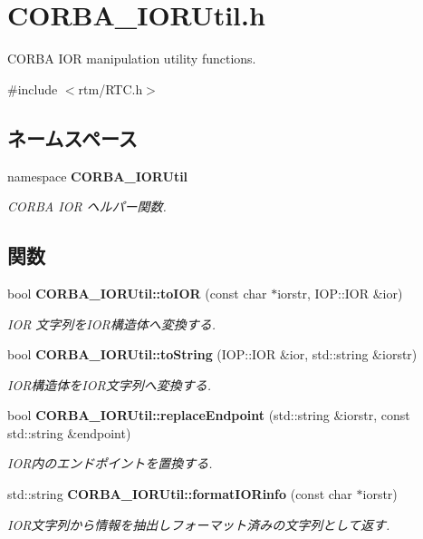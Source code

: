 \section{CORBA\_\-IORUtil.h}
\label{CORBA__IORUtil_8h}


CORBA IOR manipulation utility functions.  


{\ttfamily \#include $<$rtm/RTC.h$>$}\par
\subsection*{ネームスペース}
\begin{DoxyCompactItemize}
\item 
namespace {\bf CORBA\_\-IORUtil}


\begin{DoxyCompactList}\small\item\em CORBA IOR ヘルパー関数. \item\end{DoxyCompactList}

\end{DoxyCompactItemize}
\subsection*{関数}
\begin{DoxyCompactItemize}
\item 
bool {\bf CORBA\_\-IORUtil::toIOR} (const char $\ast$iorstr, IOP::IOR \&ior)
\begin{DoxyCompactList}\small\item\em IOR 文字列をIOR構造体へ変換する. \item\end{DoxyCompactList}\item 
bool {\bf CORBA\_\-IORUtil::toString} (IOP::IOR \&ior, std::string \&iorstr)
\begin{DoxyCompactList}\small\item\em IOR構造体をIOR文字列へ変換する. \item\end{DoxyCompactList}\item 
bool {\bf CORBA\_\-IORUtil::replaceEndpoint} (std::string \&iorstr, const std::string \&endpoint)
\begin{DoxyCompactList}\small\item\em IOR内のエンドポイントを置換する. \item\end{DoxyCompactList}\item 
std::string {\bf CORBA\_\-IORUtil::formatIORinfo} (const char $\ast$iorstr)
\begin{DoxyCompactList}\small\item\em IOR文字列から情報を抽出しフォーマット済みの文字列として返す. \item\end{DoxyCompactList}\end{DoxyCompactItemize}


